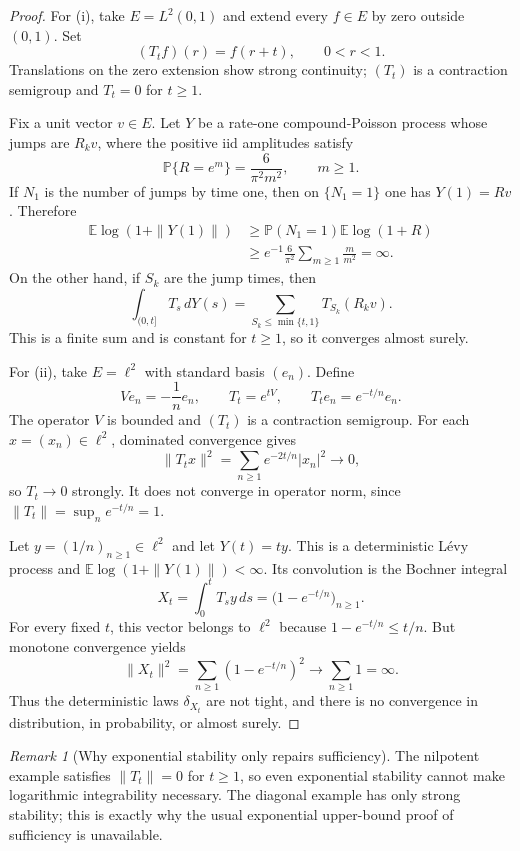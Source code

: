 \documentclass[11pt]{article}
\theoremstyle{remark}
\newtheorem{remark}[theorem]{Remark}
\newcommand{\E}{\mathbb E}
\newcommand{\Pp}{\mathbb P}
\begin{document}
\begin{proof}
For \textup{(i)}, take $E=L^2(0,1)$ and extend every $f\in E$ by zero outside
$(0,1)$.  Set
\[
 (T_tf)(r)=f(r+t),\qquad 0<r<1.
\]
Translations on the zero extension show strong continuity; $(T_t)$ is a
contraction semigroup and $T_t=0$ for $t\geq1$.

Fix a unit vector $v\in E$.  Let $Y$ be a rate-one compound-Poisson process
whose jumps are $R_kv$, where the positive iid amplitudes satisfy
\[
 \Pp\{R=e^m\}=\frac{6}{\pi^2m^2},\qquad m\geq1.
\]
If $N_1$ is the number of jumps by time one, then on $\{N_1=1\}$ one has
$Y(1)=Rv$.  Therefore
\begin{align*}
 \E\log(1+\|Y(1)\|)
 &\geq \Pp(N_1=1)\E\log(1+R)\\
 &\geq e^{-1}\frac{6}{\pi^2}\sum_{m\geq1}\frac{m}{m^2}
 =\infty.
\end{align*}
On the other hand, if $S_k$ are the jump times, then
\[
 \int_{(0,t]}T_s\,dY(s)
 =\sum_{S_k\leq \min\{t,1\}}T_{S_k}(R_kv).
\]
This is a finite sum and is constant for $t\geq1$, so it converges almost
surely.

For \textup{(ii)}, take $E=\ell^2$ with standard basis $(e_n)$.  Define
\[
 Ve_n=-\frac1n e_n,\qquad T_t=e^{tV},\qquad
 T_te_n=e^{-t/n}e_n.
\]
The operator $V$ is bounded and $(T_t)$ is a contraction semigroup.  For each
$x=(x_n)\in\ell^2$, dominated convergence gives
\[
 \|T_tx\|^2=\sum_{n\geq1}e^{-2t/n}|x_n|^2\longrightarrow0,
\]
so $T_t\to0$ strongly.  It does not converge in operator norm, since
$\|T_t\|=\sup_n e^{-t/n}=1$.

Let $y=(1/n)_{n\geq1}\in\ell^2$ and let $Y(t)=ty$.  This is a deterministic
L\'evy process and $\E\log(1+\|Y(1)\|)<\infty$.  Its convolution is the
Bochner integral
\[
 X_t=\int_0^tT_sy\,ds
     =\bigl(1-e^{-t/n}\bigr)_{n\geq1}.
\]
For every fixed $t$, this vector belongs to $\ell^2$ because
$1-e^{-t/n}\leq t/n$.  But monotone convergence yields
\[
 \|X_t\|^2=\sum_{n\geq1}(1-e^{-t/n})^2\longrightarrow
 \sum_{n\geq1}1=\infty.
\]
Thus the deterministic laws $\delta_{X_t}$ are not tight, and there is no
convergence in distribution, in probability, or almost surely.
\end{proof}

\begin{remark}[Why exponential stability only repairs sufficiency]
The nilpotent example satisfies $\|T_t\|=0$ for $t\geq1$, so even exponential
stability cannot make logarithmic integrability necessary.  The diagonal
example has only strong stability; this is exactly why the usual exponential
upper-bound proof of sufficiency is unavailable.
\end{remark}
\end{document}

